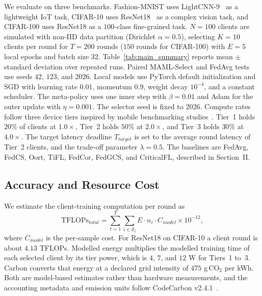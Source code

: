 \documentclass[journal]{IEEEtran}
\newcommand{\revision}[1]{#1}
\begin{document}
\revision{We evaluate on three benchmarks. Fashion-MNIST uses LightCNN-9~\cite{wu2018light} as a lightweight IoT task, CIFAR-10 uses ResNet18~\cite{he2016deep} as a complex vision task, and CIFAR-100 uses ResNet18 as a $100$-class fine-grained task.} $N = 100$ clients are simulated with non-IID data partition (Dirichlet $\alpha = 0.5$), selecting $K = 10$ clients per round for $T = 200$ rounds (\revision{$150$ rounds for CIFAR-100}) with $E = 5$ local epochs and batch size 32. \revision{Table~\ref{tab:main_summary} reports mean $\pm$ standard deviation over repeated runs. Paired MAML-Select and FedAvg tests use seeds $42$, $123$, and $2026$.} \revision{Local models use PyTorch default initialization and SGD with learning rate $0.01$, momentum $0.9$, weight decay $10^{-4}$, and a constant scheduler. The meta-policy uses one inner step with $\beta=0.01$ and Adam for the outer update with $\eta=0.001$. The selector seed is fixed to 2026.} \revision{Compute rates follow three device tiers inspired by mobile benchmarking studies~\cite{ignatov2018ai}. Tier~1 holds $20\%$ of clients at $1.0\times$, Tier~2 holds $50\%$ at $2.0\times$, and Tier~3 holds $30\%$ at $4.0\times$.} The target latency deadline $T_{target}$ is set to the average round latency of Tier~2 clients, and the trade-off parameter $\lambda = 0.5$. \revision{The baselines are FedAvg, FedCS, Oort, TiFL, FedCor, FedGCS, and CriticalFL, described in Section~II.}

\subsection{\revision{Accuracy and Resource Cost}}
\revision{We estimate the client-training computation per round as}
\begin{equation}
	\text{TFLOPs}_{total} = \sum_{t=1}^{T} \sum_{i \in \mathcal{S}_t} E \cdot n_i \cdot C_{model} \times 10^{-12},
	\label{eq:tflops}
\end{equation}
\revision{where $C_{model}$ is the per-sample cost. For ResNet18 on CIFAR-10 a client round is about $4.13$ TFLOPs. Modelled energy multiplies the modelled training time of each selected client by its tier power, which is $4$, $7$, and $12$ W for Tiers~1 to~3. Carbon converts that energy at a declared grid intensity of $475$ g\,CO$_2$ per kWh. Both are model-based estimates rather than hardware measurements, and the accounting metadata and emission units follow CodeCarbon v2.4.1~\cite{courty2024codecarbon}.}
\end{document}
